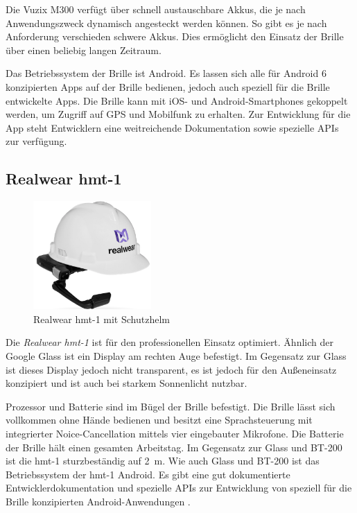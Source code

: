Die Vuzix M300 verfügt über schnell austauschbare Akkus, die je nach Anwendungszweck dynamisch angesteckt werden können. So gibt es je nach Anforderung verschieden schwere Akkus. Dies ermöglicht den Einsatz der Brille über einen beliebig langen Zeitraum.

Das Betriebssystem der Brille ist Android. Es lassen sich alle für Android 6 konzipierten Apps auf der Brille bedienen, jedoch auch speziell für die Brille entwickelte Apps. Die Brille kann mit iOS- und Android-Smartphones gekoppelt werden, um Zugriff auf GPS und Mobilfunk zu erhalten. Zur Entwicklung für die App steht Entwicklern eine weitreichende Dokumentation sowie spezielle APIs zur verfügung. \cite{Vuzix2018}
%
\subsection{Realwear hmt-1}
%
\begin{figure}[htbp]
    \centering
    \includegraphics[width=0.4\textwidth]{data/bilder/hmt1_web.png}
    \caption{Realwear hmt-1 mit Schutzhelm \cite{Realwear2018}}
    \label{fig:hmt1}
\end{figure}
%
Die \emph{Realwear hmt-1} ist für den professionellen Einsatz optimiert. Ähnlich der Google Glass ist ein Display am rechten Auge befestigt. Im Gegensatz zur Glass ist dieses Display jedoch nicht transparent, es ist jedoch für den Außeneinsatz konzipiert und ist auch bei starkem Sonnenlicht nutzbar. 

Prozessor und Batterie sind im Bügel der Brille befestigt. Die Brille lässt sich vollkommen ohne Hände bedienen und besitzt eine Sprachsteuerung mit integrierter Noice-Cancellation mittels vier eingebauter Mikrofone. Die Batterie der Brille hält einen gesamten Arbeitstag. Im Gegensatz zur Glass und BT-200 ist die hmt-1 sturzbeständig auf 2~m. Wie auch Glass und BT-200 ist das Betriebssystem der hmt-1 Android. Es gibt eine gut dokumentierte Entwicklerdokumentation und spezielle APIs zur Entwicklung von speziell für die Brille konzipierten Android-Anwendungen \cite{Realwear2018}.